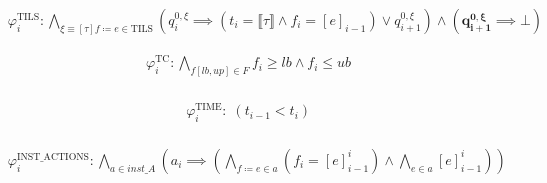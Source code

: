 \documentclass{article}
\begin{document}
\begin{align*}
    &\varphi_i^\text{TILS}: \bigwedge\limits_{\xi \equiv [\tau] f \coloneqq e \in \text{TILS}} \left( q_i^{0, \xi} \implies (t_i = \llbracket\tau\rrbracket \land f_i = [e]_{i-1}) \lor q_{i+1}^{0, \xi} \right) \land \boldsymbol{\left( q_{i+1}^{0, \xi} \implies \bot \right)}
\end{align*}

\begin{align*}
  &\varphi_{i}^{\text{TC}}: \bigwedge\limits_{f[lb, up] \in F} f_i \geq lb \land f_i \leq ub\\
\end{align*}

\begin{align*}
  &\varphi_{i}^{\text{TIME}}: \; \left( t_{i-1} < t_i \right) \\
\end{align*}

\begin{align*}
  & \varphi_{i}^{\text{INST\_ACTIONS}}: \bigwedge\limits_{a \in inst\_A} \left( a_i \implies \left( \bigwedge\limits_{f \coloneqq e \in a} \left( f_{i} = [e]_{i-1}^{i} \right) \land \bigwedge\limits_{e \in a} [e]_{i-1}^{i} \right) \right) \\
\end{align*}

\end{document}
